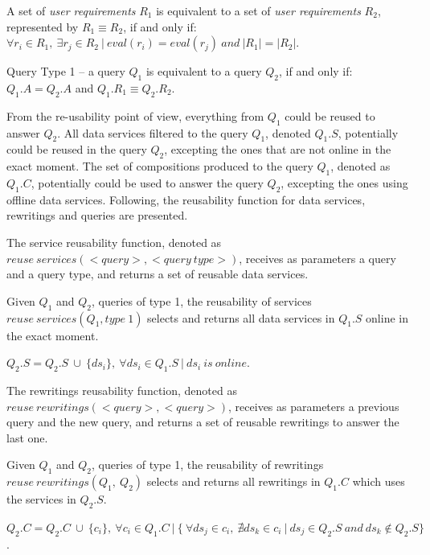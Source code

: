 \begin{definition}\label{def:reqeq}
A set of \textsl{user requirements} $R_{1}$ is equivalent to a set of \textsl{user requirements} $R_{2}$, represented by $R_{1} \equiv R_{2}$, if and only if: $\forall r_{i} \in R_{1}, \ \exists r_{j} \in R_{2} \ \vert \ eval (r_{i}) = eval(r_{j}) \ and \ \vert R_{1} \vert = \vert R_{2} \vert$.
\end{definition}

\begin{definition}\label{def:qt1}
Query Type 1 -- a query $Q_{1}$ is equivalent to a query $Q_{2}$, if and only if: $Q_{1}.A = Q_{2}.A$ and $Q_{1}.R_{1} \equiv Q_{2}.R_{2}$.
\end{definition}

From the re-usability point of view, everything from $Q_{1}$ could be reused to answer $Q_{2}$. All data services filtered to the query $Q_{1}$, denoted $Q_{1}.S$, potentially could be reused in the query $Q_{2}$, excepting the ones that are not online in the exact moment. 
The set of compositions produced to the query $Q_{1}$, denoted as $Q_{1}.C$, potentially could be used to answer the query $Q_{2}$, excepting the ones using offline data services. Following, the reusability function for data services, rewritings and queries are presented. 

The service reusability function, denoted as $reuse \ services(<query>, <query \ type>)$, receives as parameters a query and a query type, and returns a set of reusable data services.

\begin{definition}\label{def:rsqt1}
Given $Q_{1}$ and $Q_{2}$, queries of type 1, the reusability of services $reuse \ services(Q_{1}, type \ 1)$ selects and returns all data services in $Q_{1}.S$ online in the exact moment. 
\begin{center}
$Q_{2}.S = Q_{2}.S \ \cup \ \lbrace ds_{i} \rbrace, \ \forall ds_{i} \in Q_{1}.S \ \vert \ ds_{i} \ is \ online$.
\end{center}
\end{definition}

The rewritings reusability function, denoted as $reuse \ rewritings(<query>, <query>)$, receives as parameters a previous query and the new query, and returns a set of reusable rewritings to answer the last one.

\begin{definition}\label{def:rrqt1}
Given $Q_{1}$ and $Q_{2}$, queries of type 1, the reusability of rewritings $reuse \ rewritings(Q_{1}, \ Q_{2})$ selects and returns all rewritings in $Q_{1}.C$ which uses the services in $Q_{2}.S$. 
\begin{center}
$Q_{2}.C = Q_{2}.C \ \cup \ \lbrace c_{i} \rbrace, \ \forall c_{i} \in Q_{1}.C \ \vert \
   \lbrace \ \forall ds_{j} \in c_{i}, \ \nexists ds_{k} \in c_{i} \ \vert \ ds_{j} \in Q_{2}.S \ and \ ds_{k} \notin Q_{2}.S \rbrace$.
\end{center}
\end{definition}

